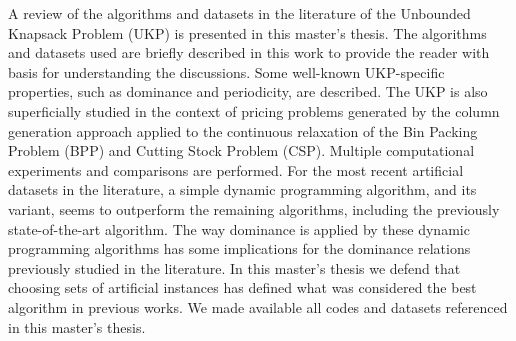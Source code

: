 A review of the algorithms and datasets in the literature of the Unbounded Knapsack Problem (UKP) is presented in this master's thesis.
The algorithms and datasets used are briefly described in this work to provide the reader with basis for understanding the discussions.
Some well-known UKP-specific properties, such as dominance and periodicity, are described.
The UKP is also superficially studied in the context of pricing problems generated by the column generation approach applied to the continuous relaxation of the Bin Packing Problem (BPP) and Cutting Stock Problem (CSP).
Multiple computational experiments and comparisons are performed.
For the most recent artificial datasets in the literature, a simple dynamic programming algorithm, and its variant, seems to outperform the remaining algorithms, including the previously state-of-the-art algorithm.
The way dominance is applied by these dynamic programming algorithms has some implications for the dominance relations previously studied in the literature.
In this master's thesis we defend that choosing sets of artificial instances has defined what was considered the best algorithm in previous works.
We made available all codes and datasets referenced in this master's thesis.
